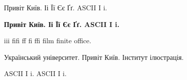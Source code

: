 \documentclass[10pt]{article}
\begin{document}
\noindent Привіт Київ. Іі Її Єє Ґґ. ASCII I i.\par
\noindent \textbf{Привіт Київ. Іі Її Єє Ґґ. ASCII I i.}\par
\noindent iii fifi ff fi ffi film finite office.\par
\parbox{65pt}{Український університет. Привіт Київ. Інститут ілюстрація.}
\par
{}
\noindent ASCII I i. {\selectfont ASCII I i.}\par
\end{document}
